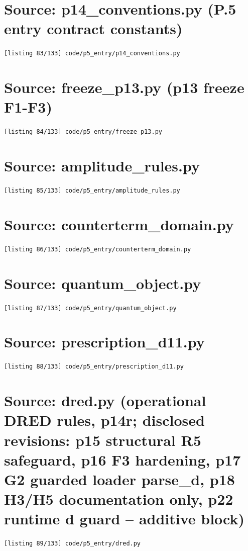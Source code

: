 \section{Source: p14\_conventions.py (P.5 entry contract constants)}
\noindent\texttt{[listing 83/133] code/p5\_entry/p14\_conventions.py}
{\scriptsize}

\section{Source: freeze\_p13.py (p13 freeze F1-F3)}
\noindent\texttt{[listing 84/133] code/p5\_entry/freeze\_p13.py}
{\scriptsize}

\section{Source: amplitude\_rules.py}
\noindent\texttt{[listing 85/133] code/p5\_entry/amplitude\_rules.py}
{\scriptsize}

\section{Source: counterterm\_domain.py}
\noindent\texttt{[listing 86/133] code/p5\_entry/counterterm\_domain.py}
{\scriptsize}

\section{Source: quantum\_object.py}
\noindent\texttt{[listing 87/133] code/p5\_entry/quantum\_object.py}
{\scriptsize}

\section{Source: prescription\_d11.py}
\noindent\texttt{[listing 88/133] code/p5\_entry/prescription\_d11.py}
{\scriptsize}

\section{Source: dred.py (operational DRED rules, p14r; disclosed revisions: p15 structural R5 safeguard, p16 F3 hardening, p17 G2 guarded loader parse\_d, p18 H3/H5 documentation only, p22 runtime d guard -- additive block)}
\noindent\texttt{[listing 89/133] code/p5\_entry/dred.py}
{\scriptsize}

